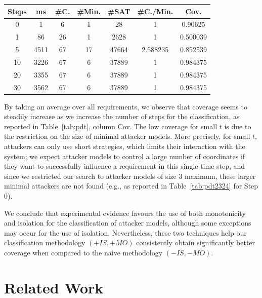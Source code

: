 {\begin{table}[!t]
\begin{minipage}{0.45\textwidth}
{\begin{tabular}{|c|c|c|c|c|c|c|}
\hline
Steps & ms &  \#C. & \#Min. & \#SAT & \#C./Min. & Cov.\\
\hline
0 & 1 & 6 & 1 & 28 & 1 & 0.90625\\
1 & 86 & 26 & 1 & 2628 & 1 & 0.500039\\
5 & 4511 & 67 & 17 & 47664 & 2.588235 & 0.852539\\
10 & 3226 & 67 & 6 & 37889 & 1 & 0.984375\\
20 & 3355 & 67 & 6 & 37889 & 1 & 0.984375\\
30 & 3562 & 67 & 6 & 37889 & 1 & 0.984375\\
 \hline
\end{tabular}
}
\label{tab:pdt2367}
\end{minipage}
\end{table}
By taking an average over all requirements, we observe that coverage seems to steadily increase as we increase the number of steps for the classification, as reported in Table~\ref{tab:pdt}, column Cov. The low coverage for small $t$ is due to the restriction on the size of minimal attacker models. More precisely, for small $t$, attackers can only use short strategies, which limits their interaction with the system; we expect attacker models to control a large number of coordinates if they want to successfully influence a requirement in this single time step, and since we restricted our search to attacker models of size 3 maximum, these larger minimal attackers are not found (e.g., as reported in Table~\ref{tab:pdt2324} for Step 0).

We conclude that experimental evidence favours the use of both monotonicity and isolation for the classification of attacker models, although  some exceptions may occur for the use of isolation. Nevertheless, these two techniques help our classification methodology $(+IS,+MO)$ consistently obtain significantly better coverage when compared to the naive methodology $(-IS,-MO)$.

\section{Related Work}
\label{sec:discussion}

}
